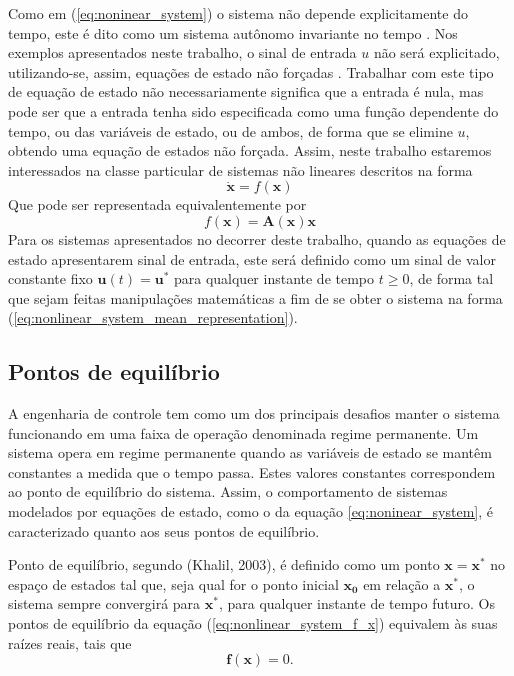 Como em (\ref{eq:noninear_system}) o sistema não depende explicitamente do tempo, este é dito como um sistema autônomo invariante no tempo \cite{bookkhalil:2003}. Nos exemplos apresentados neste trabalho, o sinal de entrada $u$ não será explicitado, utilizando-se, assim, equações de estado não forçadas \cite{bookkhalil:2003}. Trabalhar com este tipo de equação de estado não necessariamente significa que a entrada é nula, mas pode ser que a entrada tenha sido especificada como uma função dependente do tempo, ou das variáveis de estado, ou de ambos, de forma que se elimine $u$, obtendo uma equação de estados não forçada. Assim, neste trabalho estaremos interessados na classe particular de sistemas não lineares descritos na forma
\begin{equation}\label{eq:nonlinear_system_f_x}
\dot{\textbf{x}} = f(\textbf{x})
\end{equation}
Que pode ser representada equivalentemente por
\begin{equation}\label{eq:nonlinear_system_mean_representation}
	f(\textbf{x})=\textbf{A}(\textbf{x})\textbf{x}
\end{equation}
Para os sistemas apresentados no decorrer deste trabalho, quando as equações de estado apresentarem sinal de entrada, este será definido como um sinal de valor constante fixo $\textbf{u}(t)=\textbf{u}^*$ para qualquer instante de tempo $t \geq 0$, de forma tal que sejam feitas manipulações matemáticas a fim de se obter o sistema na forma (\ref{eq:nonlinear_system_mean_representation}).

\subsection{Pontos de equilíbrio}\label{subsec_pontoEq}

A engenharia de controle tem como um dos principais desafios manter o sistema funcionando em uma faixa de operação denominada regime permanente. Um sistema opera em regime permanente quando as variáveis de estado se mantêm constantes a medida que o tempo passa. Estes valores constantes correspondem ao ponto de equilíbrio do sistema\cite{bookboydl:1994}. Assim, o comportamento de sistemas modelados por equações de estado, como o da equação \ref{eq:noninear_system}, é caracterizado quanto aos seus  pontos de equilíbrio.

Ponto de equilíbrio, segundo (Khalil, 2003)\cite{bookkhalil:2003}, é definido como um ponto $\mathbf{x = x^*}$ no espaço de estados tal que, seja qual for o ponto inicial $\mathbf{x_0}$ em relação a $\mathbf{x^*}$, o sistema sempre convergirá para $\mathbf{x^*}$, para qualquer instante de tempo futuro.
Os pontos de equilíbrio da equação (\ref{eq:nonlinear_system_f_x}) equivalem às suas raízes reais, tais que
\begin{equation}\label{eq:ponto_de_eq}
\mathbf{f(x)} = 0.
\end{equation}

